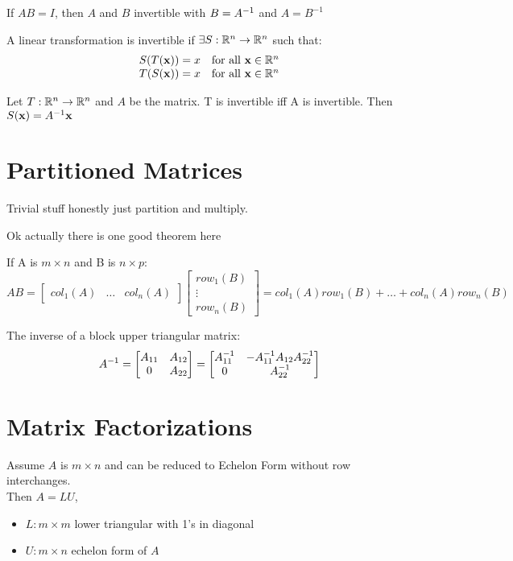 \documentclass{report}
\begin{document}
If $AB = I$, then $A$ and $B$ invertible with $B = A^{-1}$ and $A = B^{-1}$

A linear transformation is invertible if $\exists S: \mathbb{R}^n \to \mathbb{R}^n$ such that:
\[
\begin{array}{rlr}
    S(T(\mathbf{x})) = x & \text{for all } \mathbf{x} \in \mathbb{R}^n \\
    T(S(\mathbf{x})) = x & \text{for all } \mathbf{x} \in \mathbb{R}^n \\
\end{array}
\]

\begin{theorem}
    Let $T : \mathbb{R}^n \to \mathbb{R}^n$ and $A$ be the matrix. T is invertible iff A is invertible.
    Then $S(\mathbf{x}) = A^{-1} \mathbf{x} $
\end{theorem}

\section{Partitioned Matrices}

Trivial stuff honestly just partition and multiply.

Ok actually there is one good theorem here
\begin{theorem}\end{theorem}
If A is $m \times n$ and B is $n \times p$:
\[
AB = \begin{bmatrix}col_1(A) & \ldots & col_n(A)\end{bmatrix} \begin{bmatrix}row_1(B) \\ \vdots \\ row_n(B)\end{bmatrix} = col_1(A) row_1(B) + \ldots + col_n(A) row_n(B) 
\]

The inverse of a block upper triangular matrix:
\[
A^{-1} = \begin{bmatrix}
    A_{11} & A_{12} \\
    0 & A_{22}
\end{bmatrix} = \begin{bmatrix}
    A_{11}^{-1} & -A_{11}^{-1}A_{12}A_{22}^{-1} \\
    0 & A_{22}^{-1}
\end{bmatrix}
\]

\section{Matrix Factorizations}

Assume $A$ is $m \times n$ and can be reduced to Echelon Form without row interchanges. \\
Then $A = LU$, 
\begin{itemize}
    \item $L: m \times m$ lower triangular with 1's in diagonal
    \item $U: m \times n$ echelon form of $A$
\end{itemize} 
\end{document}
